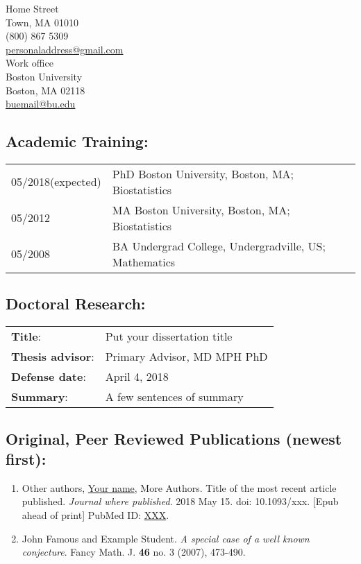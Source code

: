 \documentclass[12pt, letterpaper]{report}   %
\begin{document}
\setlength{\columnsep}{1.5in}
\begin{multicols}{2}{
\begin{center}{
Home Street \\ Town, MA 01010 \\ (800) 867 5309 \\ \hyperlink{mailto:personaladdress@gmail.com}{personaladdress@gmail.com}\\
Work office \\Boston University \\ Boston, MA 02118 \\\hyperlink{mailto:buemail@bu.edu}{buemail@bu.edu}\\}
\end{center}}
\end{multicols}

\subsection*{Academic Training:}
\begin{tabular}{p{}p{}}
05/2018\small(expected) &  PhD Boston University, Boston, MA; Biostatistics\\
05/2012  & MA Boston University, Boston, MA; Biostatistics \\
05/2008  & BA Undergrad College, Undergradville, US; Mathematics \\
\end{tabular}

\subsection*{Doctoral Research:}
\begin{tabular}{p{}p{}}
\textbf{Title}: & Put your dissertation title \\
\textbf{Thesis advisor}: & Primary Advisor, MD MPH PhD\\
\textbf{Defense date}: & April 4, 2018 \\
\textbf{Summary}: & A few sentences of summary \\
\end{tabular}

\subsection*{Original, Peer Reviewed Publications (newest first):}
\begin{enumerate}
\item Other authors, \underline{Your name}, More Authors. Title of the most recent article published. \emph{Journal where published}. 2018 May 15. doi: 10.1093/xxx. [Epub ahead of print] PubMed ID: \hyperlink{https://www.ncbi.nlm.nih.gov/pubmed/XXX}{XXX}.
\item John Famous and Example Student. \emph{A special case of a well known conjecture}. Fancy Math. J. \textbf{46} no. 3 (2007), 473-490.
\end{enumerate}
\end{document}
